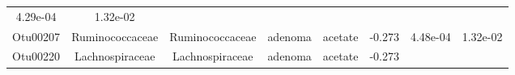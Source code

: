 \documentclass[11pt,]{article}
\begin{document}
\begin{longtable}[]{@{}cccccccc@{}}
\begin{minipage}[t]{0.08\columnwidth}
4.29e-04\strut
\end{minipage} & \begin{minipage}[t]{0.08\columnwidth}\centering\strut
1.32e-02\strut
\end{minipage}\tabularnewline
\begin{minipage}[t]{0.08\columnwidth}\centering\strut
Otu00207\strut
\end{minipage} & \begin{minipage}[t]{0.15\columnwidth}\centering\strut
Ruminococcaceae\strut
\end{minipage} & \begin{minipage}[t]{0.15\columnwidth}\centering\strut
Ruminococcaceae\strut
\end{minipage} & \begin{minipage}[t]{0.08\columnwidth}\centering\strut
adenoma\strut
\end{minipage} & \begin{minipage}[t]{0.09\columnwidth}\centering\strut
acetate\strut
\end{minipage} & \begin{minipage}[t]{0.07\columnwidth}\centering\strut
-0.273\strut
\end{minipage} & \begin{minipage}[t]{0.08\columnwidth}\centering\strut
4.48e-04\strut
\end{minipage} & \begin{minipage}[t]{0.08\columnwidth}\centering\strut
1.32e-02\strut
\end{minipage}\tabularnewline
\begin{minipage}[t]{0.08\columnwidth}\centering\strut
Otu00220\strut
\end{minipage} & \begin{minipage}[t]{0.15\columnwidth}\centering\strut
Lachnospiraceae\strut
\end{minipage} & \begin{minipage}[t]{0.15\columnwidth}\centering\strut
Lachnospiraceae\strut
\end{minipage} & \begin{minipage}[t]{0.08\columnwidth}\centering\strut
adenoma\strut
\end{minipage} & \begin{minipage}[t]{0.09\columnwidth}\centering\strut
acetate\strut
\end{minipage} & \begin{minipage}[t]{0.07\columnwidth}\centering\strut
-0.273\strut
\end{minipage} & \begin{minipage}[t]{0.08\columnwidth}\centering\strut

\end{minipage}
\end{longtable}
\end{document}
